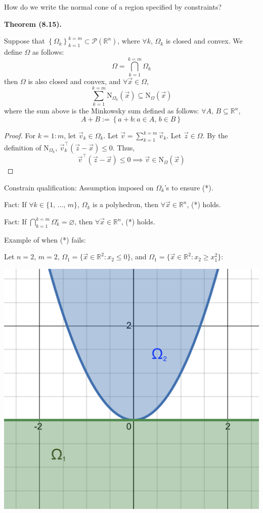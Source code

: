 \documentclass{article}
\newcommand{\R}{\mathbb{R}}
\begin{document}
How do we write the normal cone of a region specified by constraints?

\textbf{Theorem (8.15).}

Suppose that $\left\{\Omega_k\right\}_{k = 1}^{k = m} \subset \mathcal{P}(\R^n)$, where $\forall k$, $\Omega_k$ is closed and convex. We define $\Omega$ as follows:
\[
    \Omega = \bigcap_{k = 1}^{k = m} \Omega_k
\]
then $\Omega$ is also closed and convex, and $\forall \vec{x} \in \Omega$,
\[
    \sum_{k = 1}^{k = m} \text{N}_{\Omega_k}(\vec{x}) \subseteq \text{N}_{\Omega}(\vec{x}) \tag{*}
\]
where the sum above is the Minkowsky sum defined as follows: $\forall A,\, B \subseteq \R^n$,
\[
    A + B := \left\{a + b : a \in A,\, b \in B\right\}
\]
\begin{proof}
    For $k = 1 : m$, let $\vec{v}_k \in \Omega_k$. Let $\vec{v} = \sum_{k = 1}^{k = m} \vec{v}_k$. Let $\vec{z} \in \Omega$. By the definition of $\text{N}_{\Omega_k}$, $\vec{v}_k^\top(\vec{z} - \vec{x}) \leq 0$. Thus,
    \[
        \vec{v}^\top(\vec{z} - \vec{x}) \leq 0 \implies \vec{v} \in \text{N}_{\Omega}(\vec{x})
    \]
\end{proof}
Constrain qualification: Assumption imposed on $\Omega_k$'s to ensure (*).

Fact: If $\forall k \in \{1,\, \ldots,\, m\}$, $\Omega_k$ is a polyhedron, then $\forall \vec{x} \in \R^n$, (*) holds.

Fact: If $\bigcap_{k = 1}^{k = m} \Omega_k^\circ = \varnothing$, then $\forall \vec{x} \in \R^n$, (*) holds.

Example of when (*) fails:

Let $n = 2$, $m = 2$, $\Omega_1 = \{\vec{x} \in \R^2 : x_2 \leq 0\}$, and $\Omega_1 = \{\vec{x} \in \R^2 : x_2 \geq x_1^2\}$:

\begin{center}
    \includegraphics[scale=0.5]{Omegas.png}
\end{center}
\end{document}
